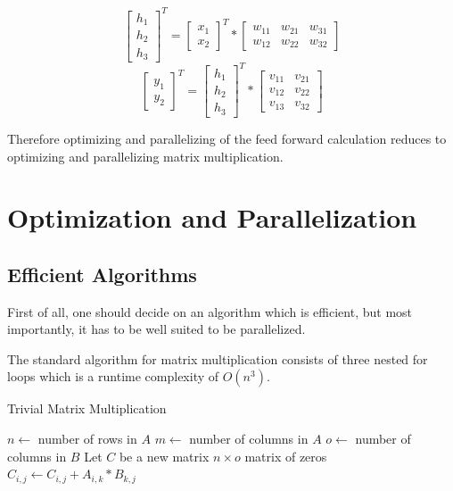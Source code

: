 \documentclass[sigconf]{acmart}
\begin{document}
{\begin{displaymath}
\begin{bmatrix}
    h_1 \\
    h_2 \\
    h_3
\end{bmatrix}
^T =
\begin{bmatrix}
    x_1 \\ x_2
\end{bmatrix} ^ T 
*
\begin{bmatrix}
    w_{11} & w_{21} & w_{31} \\
    w_{12} & w_{22} & w_{32}
\end{bmatrix}
\end{displaymath}
\begin{displaymath}
\begin{bmatrix}
    y_{1} \\
    y_{2}
\end{bmatrix}^T = 
\begin{bmatrix}
    h_1 \\
    h_2 \\
    h_3
\end{bmatrix}^T *
\begin{bmatrix}
    v_{11} & v_{21} \\
    v_{12} & v_{22} \\
    v_{13} & v_{32}
\end{bmatrix}
\end{displaymath}

Therefore optimizing and parallelizing of the feed forward calculation reduces to optimizing and
parallelizing matrix multiplication.
}

\section{Optimization and Parallelization}
\subsection{Efficient Algorithms}
First of all, one should decide on an algorithm which is efficient, but most importantly, it has to be well suited to be parallelized.

The standard algorithm for matrix multiplication consists of three nested for loops which is a runtime complexity of $O(n^3)$.

\begin{algorithm}
    \caption{Trivial Matrix Multiplication}
    \begin{algorithmic}[1]
        \State $n \gets$ number of rows in $A$
        \State $m \gets$ number of columns in $A$
        \State $o \gets$ number of columns in $B$
        \State Let $C$ be a new matrix $n \times o$ matrix of zeros
                    \State $C_{i,j} \gets C_{i,j} + A_{i,k} * B_{k,j}$
                \EndFor
            \EndFor
        \EndFor
        \State {}
    \EndProcedure
    \end{algorithmic}
\end{algorithm}
    
\end{document}
